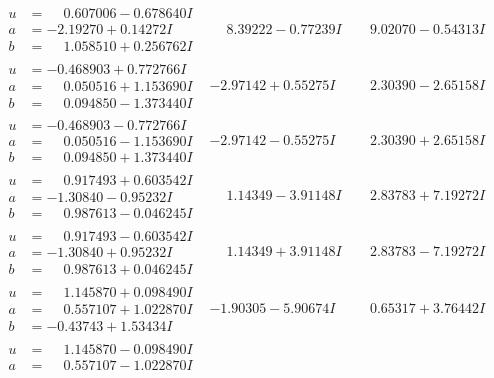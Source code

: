 \documentclass[1p]{elsarticle_modified}
\theoremstyle{definition}
\begin{document}
$$\begin{array}{c|c|c}
\begin{aligned}
u &= \phantom{-}0.607006 - 0.678640 I \\
a &= -2.19270 + 0.14272 I \\
b &= \phantom{-}1.058510 + 0.256762 I\end{aligned}
 & \phantom{-}8.39222 - 0.77239 I & \phantom{-}9.02070 - 0.54313 I \\ \hline\begin{aligned}
u &= -0.468903 + 0.772766 I \\
a &= \phantom{-}0.050516 + 1.153690 I \\
b &= \phantom{-}0.094850 - 1.373440 I\end{aligned}
 & -2.97142 + 0.55275 I & \phantom{-}2.30390 - 2.65158 I \\ \hline\begin{aligned}
u &= -0.468903 - 0.772766 I \\
a &= \phantom{-}0.050516 - 1.153690 I \\
b &= \phantom{-}0.094850 + 1.373440 I\end{aligned}
 & -2.97142 - 0.55275 I & \phantom{-}2.30390 + 2.65158 I \\ \hline\begin{aligned}
u &= \phantom{-}0.917493 + 0.603542 I \\
a &= -1.30840 - 0.95232 I \\
b &= \phantom{-}0.987613 - 0.046245 I\end{aligned}
 & \phantom{-}1.14349 - 3.91148 I & \phantom{-}2.83783 + 7.19272 I \\ \hline\begin{aligned}
u &= \phantom{-}0.917493 - 0.603542 I \\
a &= -1.30840 + 0.95232 I \\
b &= \phantom{-}0.987613 + 0.046245 I\end{aligned}
 & \phantom{-}1.14349 + 3.91148 I & \phantom{-}2.83783 - 7.19272 I \\ \hline\begin{aligned}
u &= \phantom{-}1.145870 + 0.098490 I \\
a &= \phantom{-}0.557107 + 1.022870 I \\
b &= -0.43743 + 1.53434 I\end{aligned}
 & -1.90305 - 5.90674 I & \phantom{-}0.65317 + 3.76442 I \\ \hline\begin{aligned}
u &= \phantom{-}1.145870 - 0.098490 I \\
a &= \phantom{-}0.557107 - 1.022870 I \\

\end{aligned}
\end{array}$$
\end{document}
